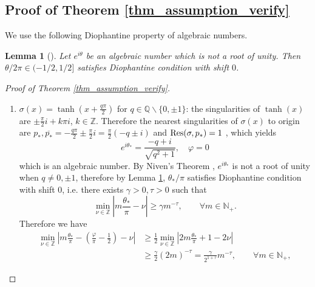 \documentclass{article}
\numberwithin{equation}{section}
\newtheorem{lemma}{Lemma}
\def\QQ{\mathbb{Q}}
\def\ZZ{\mathbb{Z}}
\begin{document}
    
\subsection{Proof of Theorem \ref{thm_assumption_verify}}
    We use the following Diophantine property of algebraic numbers.
    \begin{lemma}[{\cite[Theorem 1.1]{ferreira2026arithmeticpropertiesargumentsalgebraic}}] \label{lem:algebraic-Diophantine}
        Let $e^{i\theta}$ be an algebraic number which is not a root of unity. Then $\theta/ 2\pi \in (-1/2,1/2]$ satisfies Diophantine condition with shift $0$.
    \end{lemma}

    \begin{proof}[Proof of Theorem \ref{thm_assumption_verify}]
    
    \begin{enumerate}
        \item $\displaystyle\sigma(x) = \tanh(x+\frac{q\pi}{2})$ for $\displaystyle q\in\QQ\backslash\{0,\pm 1\}$: the singularities of $\tanh(x)$ are $\displaystyle\pm \frac{\pi}{2}i + k\pi i$, $k\in\ZZ$. Therefore the nearest singularities of $\sigma(x)$ to origin are $\displaystyle p_\ast, \overline{p_\ast} = -\frac{q\pi}{2} \pm \frac{\pi}{2}i = \frac{\pi}{2}(-q\pm i)$ and ${\rm Res}(\sigma,p_\ast) = 1$ , which yields 
        $$ e^{i\theta_\ast} = \frac{-q + i}{\sqrt{q^2 + 1}}, \quad \varphi = 0$$
        which is an algebraic number. By Niven's Theorem \cite{Olmsted1945}, $e^{i\theta_\ast}$ is not a root of unity when $q\neq 0,\pm 1$, therefore by Lemma \ref{lem:algebraic-Diophantine}, $\theta_\ast/\pi$ satisfies Diophantine condition with shift $0$, i.e. there exists $\gamma>0,\tau>0$ such that
        \begin{equation}
        \min_{\nu\in\mathbb Z}|m\frac{\theta_\ast}{\pi}-\nu|
        \geq \gamma m^{-\tau},
        \qquad \forall m\in\mathbb N_+.
        \end{equation}
        Therefore we have 
        \begin{equation}
        \begin{split}
            \min_{\nu\in\mathbb Z}|m\frac{\theta_\ast}{\pi}-(\frac{\varphi}{\pi}-\frac{1}{2})-\nu|
            &\geq \frac{1}{2}\min_{\nu\in\mathbb Z}|2m\frac{\theta_\ast}{\pi}+1-2\nu| \\
            &\geq \frac{\gamma}{2} (2m)^{-\tau} = \frac{\gamma}{2^{1+\tau}}m^{-\tau},
        \qquad \forall m\in\mathbb N_+,
        \end{split}

\end{equation}
\end{enumerate}
\end{proof}
\end{document}
